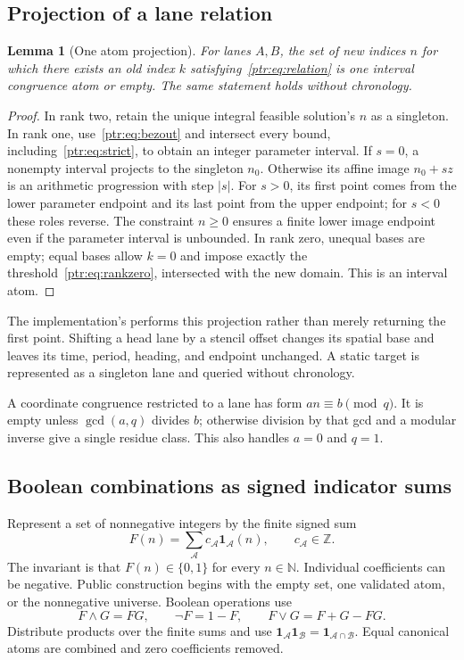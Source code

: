 \documentclass[11pt,letterpaper]{article}
\newtheorem{lemma}[theorem]{Lemma}
\theoremstyle{definition}\newtheorem{definition}[theorem]{Definition}
\theoremstyle{remark}\newtheorem{remark}[theorem]{Remark}
\newcommand{\Z}{\mathbb Z}\newcommand{\N}{\mathbb N}\newcommand{\Zp}{\mathbb Z_{>0}}
\newcommand{\ind}{\mathbf 1}\newcommand{\dom}{\operatorname{dom}}
\newcommand{\code}[1]{\texttt{\detokenize{#1}}}
\begin{document}
\subsection{Projection of a lane relation}
\begin{lemma}[One atom projection]\label{ptr:lem:projection}
For lanes $A,B$, the set of new indices $n$ for which there exists an old index $k$ satisfying~\eqref{ptr:eq:relation} is one interval congruence atom or empty. The same statement holds without chronology.
\end{lemma}
\begin{proof}
In rank two, retain the unique integral feasible solution's $n$ as a singleton. In rank one, use~\eqref{ptr:eq:bezout} and intersect every bound, including~\eqref{ptr:eq:strict}, to obtain an integer parameter interval. If $s=0$, a nonempty interval projects to the singleton $n_0$. Otherwise its affine image $n_0+sz$ is an arithmetic progression with step $|s|$. For $s>0$, its first point comes from the lower parameter endpoint and its last point from the upper endpoint; for $s<0$ these roles reverse. The constraint $n\ge0$ ensures a finite lower image endpoint even if the parameter interval is unbounded. In rank zero, unequal bases are empty; equal bases allow $k=0$ and impose exactly the threshold~\eqref{ptr:eq:rankzero}, intersected with the new domain. This is an interval atom.
\end{proof}
The implementation's \code{relation_indices} performs this projection rather than merely returning the first point. Shifting a head lane by a stencil offset changes its spatial base and leaves its time, period, heading, and endpoint unchanged. A static target is represented as a singleton lane and queried without chronology.

A coordinate congruence restricted to a lane has form $an\equiv b\pmod q$. It is empty unless $\gcd(a,q)$ divides $b$; otherwise division by that gcd and a modular inverse give a single residue class. This also handles $a=0$ and $q=1$.

\subsection{Boolean combinations as signed indicator sums}
Represent a set of nonnegative integers by the finite signed sum
\begin{equation}\label{ptr:eq:signed}
 F(n)=\sum_{\mathcal A}c_{\mathcal A}\ind_{\mathcal A}(n),
 \qquad c_{\mathcal A}\in\Z.
\end{equation}
The invariant is that $F(n)\in\{0,1\}$ for every $n\in\N$. Individual coefficients can be negative. Public construction begins with the empty set, one validated atom, or the nonnegative universe. Boolean operations use
\begin{equation}\label{ptr:eq:boolean}
 F\wedge G=FG,\qquad \neg F=1-F,\qquad F\vee G=F+G-FG.
\end{equation}
Distribute products over the finite sums and use
$\ind_{\mathcal A}\ind_{\mathcal B}=\ind_{\mathcal A\cap\mathcal B}$.
Equal canonical atoms are combined and zero coefficients removed.
\end{document}

